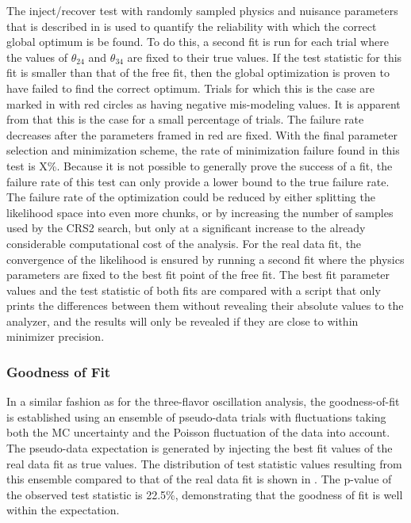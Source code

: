 The inject/recover test with randomly sampled physics and nuisance parameters that is described in  is used to quantify the reliability with which the correct global optimum is be found. To do this, a second fit is run for each trial where the values of $\theta_{24}$ and $\theta_{34}$ are fixed to their true values. If the test statistic for this fit is smaller than that of the free fit, then the global optimization is proven to have failed to find the correct optimum. Trials for which this is the case are marked in  with red circles as having negative mis-modeling values. It is apparent from  that this is the case for a small percentage of trials. The failure rate decreases after the parameters framed in red are fixed. With the final parameter selection and minimization scheme, the rate of minimization failure found in this test is X\%. Because it is not possible to generally prove the success of a fit, the failure rate of this test can only provide a lower bound to the true failure rate. The failure rate of the optimization could be reduced by either splitting the likelihood space into even more chunks, or by increasing the number of samples used by the \textsc{CRS2} search, but only at a significant increase to the already considerable computational cost of the analysis. For the real data fit, the convergence of the likelihood is ensured by running a second fit where the physics parameters are fixed to the best fit point of the free fit. The best fit parameter values and the test statistic of both fits are compared with a script that only prints the differences between them without revealing their absolute values to the analyzer, and the results will only be revealed if they are close to within minimizer precision.

\subsubsection{Goodness of Fit}
In a similar fashion as for the three-flavor oscillation analysis, the goodness-of-fit is established using an ensemble of pseudo-data trials with fluctuations taking both the MC uncertainty and the Poisson fluctuation of the data into account. The pseudo-data expectation is generated by injecting the best fit values of the real data fit as true values. The distribution of test statistic values resulting from this ensemble compared to that of the real data fit is shown in . The p-value of the observed test statistic is 22.5\%, demonstrating that the goodness of fit is well within the expectation. 

